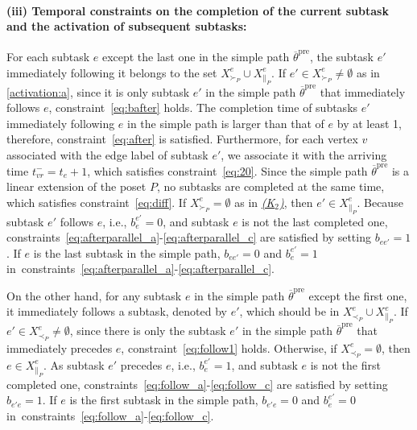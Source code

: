 \documentclass[Afour,sageh,times]{sagej}
\begin{document}
{{\paragraph{(iii) Temporal constraints on the completion of the
current subtask and the activation of subsequent
subtasks:}
For each subtask $e$ except the last one in the simple path $\overline{\theta}^{\text{pre}}$, the subtask $e'$ immediately following it belongs to the set $X_{\succ_P}^e \cup X_{\|_P}^e$. If $e' \in X_{\succ_P}^e \neq \emptyset$ as in \ref{activation:a}, since it is only subtask $e'$ in the simple path $\overline{\theta}^{\text{pre}}$ that immediately follows $e$, constraint~\eqref{eq:bafter} holds. The completion time  of subtasks $e'$ immediately following  $e$ in the simple path is larger than that of $e$ by at least 1, therefore, constraint~\eqref{eq:after} is satisfied. %
Furthermore, for each vertex $v$ associated with the edge label of subtask $e'$, we associate it with the arriving time $t_{vr}^- = t_{e}+1$, which satisfies constraint~\eqref{eq:20}. Since the simple path $\overline{\theta}^{\text{pre}}$ is a linear extension of the poset $P$, no subtasks are completed at the same time, which satisfies constraint~\eqref{eq:diff}. If $X_{\succ_P}^e = \emptyset$ as in \hyperref[activation:b]{\it (K$_2$)}, then $e' \in X_{\|_P}^e$. Because subtask $e'$ follows $e$, i.e., $b_e^{e'}=0$, and  subtask $e$ is not the last completed one, constraints~\eqref{eq:afterparallel_a}-\eqref{eq:afterparallel_c} are satisfied by setting $b_{ee'}=1$.  If $e$ is the last subtask in the simple path, $b_{ee'}=0$ and $b_{e}^{e'}=1$ in~constraints~\eqref{eq:afterparallel_a}-\eqref{eq:afterparallel_c}.

On the other hand, for any subtask $e$ in the simple path $\overline{\theta}^{\text{pre}}$ except the first one, it immediately follows a subtask, denoted by $e'$, which should be in $X_{\prec_P}^e \cup X_{\|_P}^e$. If $e'\in  X_{\prec_P}^e \neq \emptyset$, since there is only the subtask $e'$ in the simple path $\overline{\theta}^{\text{pre}}$ that immediately precedes $e$, constraint~\eqref{eq:follow1} holds. Otherwise, if $X_{\prec_P}^e = \emptyset$, then $e \in X_{\|_P}^e$. As subtask $e'$ precedes $e$, i.e., $b_e^{e'}=1$, and subtask $e$ is not the first completed one, constraints~\eqref{eq:follow_a}-\eqref{eq:follow_c} are satisfied by setting $b_{e'e}=1$.  If $e$ is the first subtask in the simple path, $b_{e'e}=0$ and $b_e^{e'}=0$ in~constraints~\eqref{eq:follow_a}-\eqref{eq:follow_c}.

}}
\end{document}
